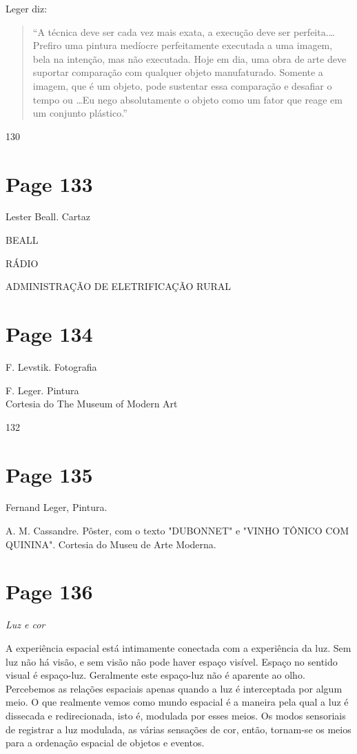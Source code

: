 \documentclass[a4paper]{article}
\begin{document}
Leger diz:
\begin{quote}
``A técnica deve ser cada vez mais exata, a execução deve ser perfeita.\ldots Prefiro uma pintura medíocre perfeitamente executada a uma imagem, bela na intenção, mas não executada. Hoje em dia, uma obra de arte deve suportar comparação com qualquer objeto manufaturado. Somente a imagem, que é um objeto, pode sustentar essa comparação e desafiar o tempo ou \ldots Eu nego absolutamente o objeto como um fator que reage em um conjunto plástico.''
\end{quote}

\raggedright 130

\newpage
\section*{Page 133}

Lester Beall. Cartaz

BEALL

RÁDIO

ADMINISTRAÇÃO DE ELETRIFICAÇÃO RURAL

\newpage
\section*{Page 134}

F. Levstik. Fotografia

F. Leger. Pintura \\
Cortesia do The Museum of Modern Art

132

\newpage
\section*{Page 135}

Fernand Leger, Pintura.

A. M. Cassandre. Pôster, com o texto "DUBONNET" e "VINHO TÔNICO COM QUININA". Cortesia do Museu de Arte Moderna.

\newpage
\section*{Page 136}

\centering\itshape Luz e cor\par

\indent A experiência espacial está intimamente conectada com a experiência da luz. Sem luz não há visão, e sem visão não pode haver espaço visível. Espaço no sentido visual é espaço-luz. Geralmente este espaço-luz não é aparente ao olho. Percebemos as relações espaciais apenas quando a luz é interceptada por algum meio. O que realmente vemos como mundo espacial é a maneira pela qual a luz é dissecada e redirecionada, isto é, modulada por esses meios. Os modos sensoriais de registrar a luz modulada, as várias sensações de cor, então, tornam-se os meios para a ordenação espacial de objetos e eventos.\par
\end{document}
